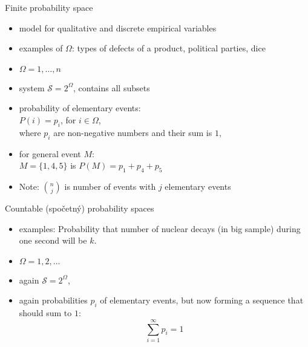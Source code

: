 \documentclass[smaller]{beamer}
\def\blue#1{{\usebeamercolor[fg]{my blue} #1}}
\def\cz#1{{\small (#1)}}
\begin{document}
\begin{frame}{Finite probability space}

\begin{itemize}
\item model for qualitative and discrete empirical variables\\
\item \blue{examples of $\Omega$:} types of defects of a product, political parties, dice
\item $\Omega={1, \dots ,n}$
\item system $\mathcal{S} = 2^\Omega$, contains all subsets
\item probability of elementary events:\\
      $P(i) = p_i$, for $i\in \Omega$,\\
      where $p_i$ are non-negative numbers and their sum is $1$, \\
\item for general event $M$:\\      
      $M = \{1,4,5\}$ is  $P(M) = p_1 + p_4 + p_5$    

\item Note: $\binom{n}{j}$ is number of events with $j$ elementary events\\
\end{itemize}
\end{frame}       

\begin{frame}{Countable \cz{spočetný} probability spaces}
\begin{itemize}
\item \blue{examples:} Probability that number of nuclear decays (in big sample) during one second will be $k$.
\item $\Omega = 1,2, \dots$\\
\item again $\mathcal{S} = 2^\Omega$,\\
\item again probabilities $p_i$ of elementary events, but now forming a sequence that should sum to $1$:\\
       \[
       \sum_{i=1}^\infty p_i = 1
       \]
\end{itemize}
\end{frame}
\end{document}
